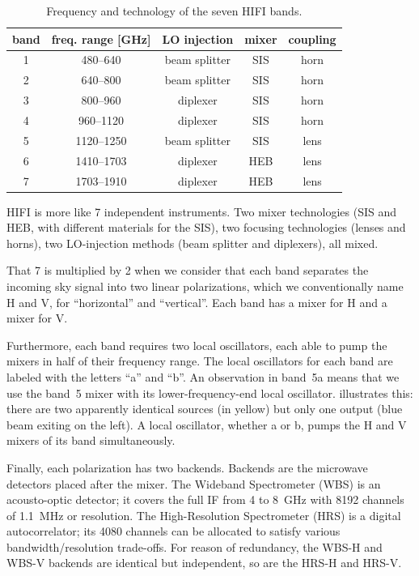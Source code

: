 \begin{table}[hbtp]
    \centering
    \begin{tabular}{ccccc}
        \toprule
        band & freq. range [\si{\giga\hertz}] & LO injection & mixer & coupling \\
        \midrule
        1 &  480--640  & beam splitter & SIS & horn\\
        2 &  640--800  & beam splitter & SIS & horn\\
        3 &  800--960  & diplexer      & SIS & horn\\
        4 &  960--1120 & diplexer      & SIS & horn\\
        5 & 1120--1250 & beam splitter & SIS & lens\\
        6 & 1410--1703 & diplexer      & HEB & lens\\
        7 & 1703--1910 & diplexer      & HEB & lens\\
        \bottomrule
    \end{tabular}
    \caption{Frequency and technology of the seven HIFI bands.}
    \label{tab:sevenbands}
\end{table}

HIFI is more like 7 independent instruments.
Two mixer technologies (SIS and HEB, with different materials for the SIS),
two focusing technologies (lenses and horns),
two LO-injection methods (beam splitter and diplexers),
all mixed.

That 7 is multiplied by 2 when we consider that each band separates the incoming sky signal into two linear polarizations, which we conventionally name H and V, for ``horizontal'' and ``vertical''.
Each band has a mixer for H and a mixer for V.

Furthermore, each band requires two local oscillators, each able to pump the mixers in half of their frequency range.
The local oscillators for each band are labeled with the letters ``a'' and ``b''.
An observation in band~5a means that we use the band~5 mixer with its lower-frequency-end local oscillator.
 illustrates this: there are two apparently identical sources (in yellow) but only one output (blue beam exiting on the left).
A local oscillator, whether a or b, pumps the H and V mixers of its band simultaneously.

Finally, each polarization has two backends.
Backends are the microwave detectors placed after the mixer.
The Wideband Spectrometer (WBS) is an acousto-optic detector; it covers the full IF from \num{4} to \SI{8}{\giga\hertz} with 8192 channels of \SI{1.1}{\mega\hertz} or resolution.
The High-Resolution Spectrometer (HRS) is a digital autocorrelator; its 4080 channels can be allocated to satisfy various bandwidth/resolution trade-offs.
For reason of redundancy, the WBS-H and WBS-V backends are identical but independent, so are the HRS-H and HRS-V.

